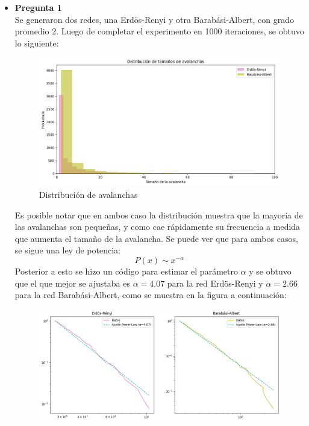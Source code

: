 \documentclass[10pt]{article}
\begin{document}
\begin{itemize}
    \item \textbf{Pregunta 1}\\
        Se generaron dos redes, una Erdös-Renyi y otra Barabási-Albert, con grado promedio 2. Luego de completar el experimento en 1000 iteraciones, se obtuvo lo siguiente:
        \begin{figure}[H]
            \centering
            \includegraphics[scale=0.55]{images/avalancha.png}
            \caption{Distribución de avalanchas}
            \label{fig:grafico_avalancha}
        \end{figure}
        Es posible notar que en ambos caso la distribución muestra que la mayoría de las avalanchas son pequeñas, y como cae rápidamente su frecuencia a medida que aumenta el tamaño de la avalancha. Se puede ver que para ambos casos, se sigue una ley de potencia: $$P(x) \sim x^{-\alpha}$$Posterior a esto se hizo un código para estimar el parámetro $\alpha$ y se obtuvo que el que mejor se ajustaba es $\alpha = 4.07$ para la red Erdös-Renyi y $\alpha = 2.66$ para la red Barabási-Albert, como se muestra en la figura a continuación:
        \begin{figure}[H]
            \centering
            \includegraphics[scale=0.55]{images/grafico_ajuste.png}

\end{figure}
\end{itemize}
\end{document}
